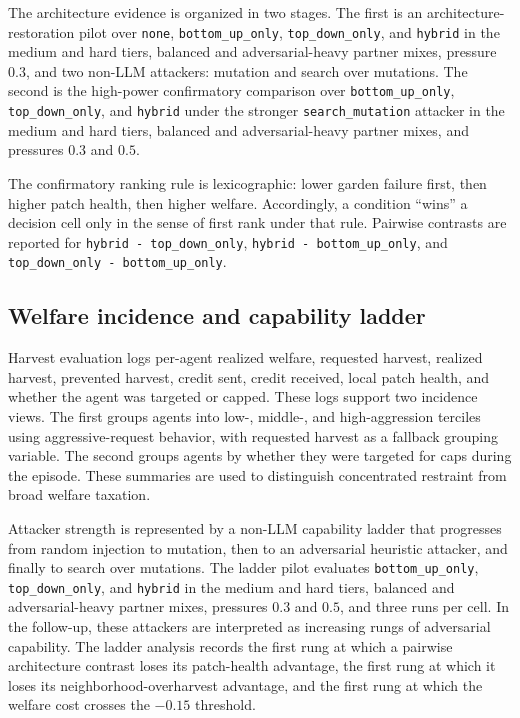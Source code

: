The architecture evidence is organized in two stages. The first is an architecture-restoration pilot over \texttt{none}, \texttt{bottom\_up\_only}, \texttt{top\_down\_only}, and \texttt{hybrid} in the medium and hard tiers, balanced and adversarial-heavy partner mixes, pressure \(0.3\), and two non-LLM attackers: mutation and search over mutations. The second is the high-power confirmatory comparison over \texttt{bottom\_up\_only}, \texttt{top\_down\_only}, and \texttt{hybrid} under the stronger \texttt{search\_mutation} attacker in the medium and hard tiers, balanced and adversarial-heavy partner mixes, and pressures \(0.3\) and \(0.5\).

The confirmatory ranking rule is lexicographic: lower garden failure first, then higher patch health, then higher welfare. Accordingly, a condition ``wins'' a decision cell only in the sense of first rank under that rule. Pairwise contrasts are reported for \texttt{hybrid - top\_down\_only}, \texttt{hybrid - bottom\_up\_only}, and \texttt{top\_down\_only - bottom\_up\_only}.

\subsection{Welfare incidence and capability ladder}

Harvest evaluation logs per-agent realized welfare, requested harvest, realized harvest, prevented harvest, credit sent, credit received, local patch health, and whether the agent was targeted or capped. These logs support two incidence views. The first groups agents into low-, middle-, and high-aggression terciles using aggressive-request behavior, with requested harvest as a fallback grouping variable. The second groups agents by whether they were targeted for caps during the episode. These summaries are used to distinguish concentrated restraint from broad welfare taxation.

Attacker strength is represented by a non-LLM capability ladder that progresses from random injection to mutation, then to an adversarial heuristic attacker, and finally to search over mutations. The ladder pilot evaluates \texttt{bottom\_up\_only}, \texttt{top\_down\_only}, and \texttt{hybrid} in the medium and hard tiers, balanced and adversarial-heavy partner mixes, pressures \(0.3\) and \(0.5\), and three runs per cell. In the follow-up, these attackers are interpreted as increasing rungs of adversarial capability. The ladder analysis records the first rung at which a pairwise architecture contrast loses its patch-health advantage, the first rung at which it loses its neighborhood-overharvest advantage, and the first rung at which the welfare cost crosses the \(-0.15\) threshold.
